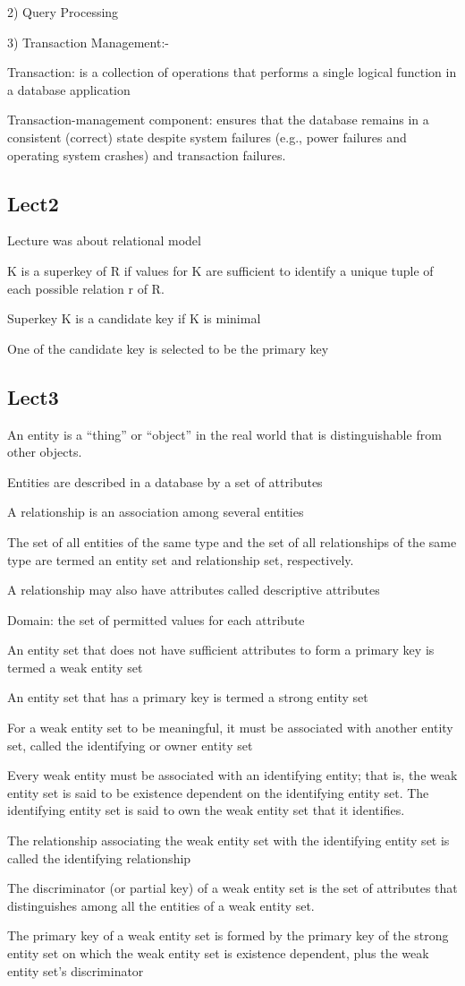 \documentclass[8pt, a4paper, oneside, twocolumn]{extarticle}
\begin{document}
2) Query Processing

3) Transaction Management:- 

Transaction: is a collection of operations that performs a single 
logical function in a database application

Transaction-management component: ensures that the database 
remains in a consistent (correct) state despite system failures (e.g., 
power failures and operating system crashes) and transaction failures.
\subsection{Lect2}
Lecture was about relational model

K is a superkey of R if values for K are sufficient to identify a unique tuple of each possible relation r of R.

Superkey K is a candidate key if K is minimal

One of the candidate key is selected to be the primary key
\subsection{Lect3}
An entity is a “thing” or “object” in the real world that is 
distinguishable from other objects. 

Entities are described in a database by a set of attributes

A relationship is an association among several entities

The set of all entities of the same type and the set of all relationships of the same type are termed an entity set and relationship set, respectively. 

A relationship may also have attributes called descriptive attributes

Domain: the set of permitted values for each attribute 

An entity set that does not have sufficient attributes to form a primary key is termed a weak entity set

An entity set that has a primary key is termed a strong entity set

For a weak entity set to be meaningful, it must be associated with another entity set, called the identifying or owner entity set

Every weak entity must be associated with an identifying entity; that is, the weak entity set is said to be existence dependent on the  identifying entity set. The identifying entity set is said to  own the  weak entity set that it identifies. 

The relationship associating the weak entity set with the identifying  entity set is called the identifying relationship

The discriminator (or partial key) of a weak entity set is the set of attributes that distinguishes among all the entities of a weak entity set.

The primary key of a weak entity set is formed by the primary key of the strong entity set on which the weak entity set is existence dependent, plus the weak entity set’s discriminator
\end{document}
